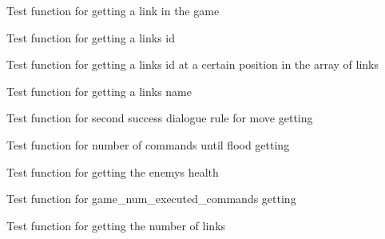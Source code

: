 \begin{DoxyRefList}
Test function for getting a link in the game  
\item[Global \mbox{\hyperlink{game__test_8c_accefa7657cd1d4d1c5956caa708ca0f8}{test2\+\_\+game\+\_\+get\+\_\+link\+\_\+id}} ()]\label{test__test000234}%
%
Test function for getting a link\textquotesingle{}s id  
\item[Global \mbox{\hyperlink{game__test_8c_a195559b2cd4040604bc938751f3fe34b}{test2\+\_\+game\+\_\+get\+\_\+link\+\_\+id\+\_\+at}} ()]\label{test__test000237}%
%
Test function for getting a link\textquotesingle{}s id at a certain position in the array of links  
\item[Global \mbox{\hyperlink{game__test_8c_a674a9b47c6002ea0e285926e1eb2ea2d}{test2\+\_\+game\+\_\+get\+\_\+link\+\_\+name}} ()]\label{test__test000240}%
%
Test function for getting a link\textquotesingle{}s name\textquotesingle{}  
\item[Global \mbox{\hyperlink{game__test_8c_a74a2574f92a13dcb8800815ee31a6658}{test2\+\_\+game\+\_\+get\+\_\+move\+\_\+dialogue\+\_\+rule}} ()]\label{test__test000325}%
%
Test function for second success dialogue rule for move getting  
\item[Global \mbox{\hyperlink{game__test_8c_abf5281d2f90a01374f6ff961acf9915f}{test2\+\_\+game\+\_\+get\+\_\+num\+\_\+commands\+\_\+till\+\_\+flood}} ()]\label{test__test000397}%
%
Test function for number of commands until flood getting  
\item[Global \mbox{\hyperlink{game__test_8c_ae28d7bcbd7969e839446495f20bf4973}{test2\+\_\+game\+\_\+get\+\_\+num\+\_\+enemies}} ()]\label{test__test000183}%
%
Test function for getting the enemy\textquotesingle{}s health  
\item[Global \mbox{\hyperlink{game__test_8c_a661be5c082a93c099b027ee9d3828515}{test2\+\_\+game\+\_\+get\+\_\+num\+\_\+executed\+\_\+commands}} ()]\label{test__test000275}%
%
Test function for game\+\_\+num\+\_\+executed\+\_\+commands getting  
\item[Global \mbox{\hyperlink{game__test_8c_a766c83b3470779a000e791c97b48b3d6}{test2\+\_\+game\+\_\+get\+\_\+num\+\_\+links}} ()]\label{test__test000265}%
%
Test function for getting the number of links  
\item[Global \mbox{\hyperlink{game__test_8c_ababf7254baa1bbad04ecfc1d4ff27500}{test2\+\_\+game\+\_\+get\+\_\+num\+\_\+objects}} ()]\label{test__test000196}%

\end{DoxyRefList}
